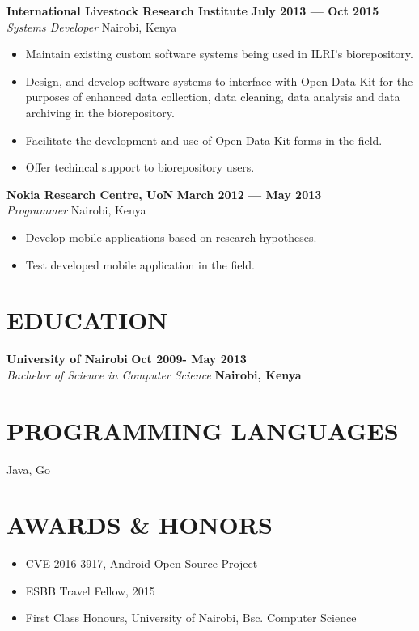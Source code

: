 \documentclass{res}
\begin{document}
\begin{resume}
	\textbf{International Livestock Research Institute} \hfill        \textbf{July 2013 --- Oct 2015} \\
	\emph{Systems Developer}       \hfill   Nairobi, Kenya
	\begin{itemize} \itemsep -2pt %
		\item Maintain existing custom software systems being used in ILRI’s biorepository.
		\item Design, and develop software systems to interface with Open Data Kit for the purposes of enhanced data collection, data cleaning, data analysis and data archiving in the biorepository.
		\item Facilitate the development and use of Open Data Kit forms in the field.
		\item Offer techincal support to biorepository users.
	\end{itemize} \vspace{-4pt}

	\textbf{Nokia Research Centre, UoN} \hfill \textbf{March 2012 --- May 2013} \\
	\emph{Programmer} \hfill Nairobi, Kenya
	\begin{itemize} \itemsep -2pt
		\item  Develop mobile applications based on research hypotheses.
		\item Test developed mobile application in the field.
	\end{itemize} \vspace{-6pt}


	\section{EDUCATION}
	\vspace{8pt}
	\textbf{University of Nairobi}  \hfill \textbf{Oct 2009- May 2013} \\
	\emph{Bachelor of Science in Computer Science} \hfill \textbf{Nairobi, Kenya}

	\section{PROGRAMMING LANGUAGES}
	\begin{itemize} \itemsep -2pt
		      \vspace {8pt}
		      Java, Go
	\end{itemize}

	\section{AWARDS \& HONORS}
	\begin{itemize} \itemsep -2pt
		\item CVE-2016-3917, Android Open Source Project
		\item ESBB Travel Fellow, 2015
		\item First Class Honours, University of Nairobi, Bsc. Computer Science
	\end{itemize}


\end{resume}
\end{document}
